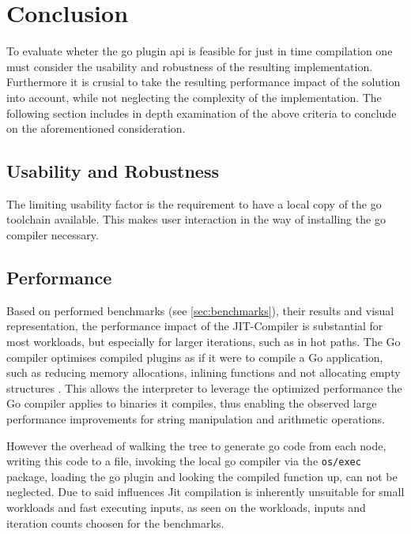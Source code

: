 \chapter{Conclusion}

To evaluate wheter the go plugin api is feasible for just in time compilation
one must consider the usability and robustness of the resulting implementation.
Furthermore it is crusial to take the resulting performance impact of the
solution into account, while not neglecting the complexity of the
implementation. The following section includes in depth examination of the
above criteria to conclude on the aforementioned consideration.

\section{Usability and Robustness}

The limiting usability factor is the requirement to have a local copy of the go
toolchain available. This makes user interaction in the way of installing the
go compiler necessary. 


\section{Performance}

Based on performed benchmarks (see \autoref{sec:benchmarks}), their results and
visual representation, the performance impact of the JIT-Compiler is
substantial for most workloads, but especially for larger iterations, such as
in hot paths. The Go compiler optimises compiled plugins as if it were to
compile a Go application, such as reducing memory allocations\cite[Escape
Analysis]{go_wiki_optimization}, inlining
functions\cite[Inlining]{go_wiki_optimization} and not allocating empty
structures \cite[Interface Values]{go_wiki_optimization}. This allows the
interpreter to leverage the optimized performance the Go compiler applies to
binaries it compiles, thus enabling the observed large performance improvements
for string manipulation and arithmetic operations.

However the overhead of walking the tree to generate go code from each node,
writing this code to a file, invoking the local go compiler via the
\texttt{os/exec} package, loading the go plugin and looking the compiled
function up, can not be neglected. Due to said influences Jit compilation
is inherently unsuitable for small workloads and fast executing inputs, as seen
on the workloads, inputs and iteration counts choosen for the benchmarks. 

